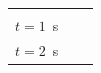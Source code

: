 {\begin{tabular}[t]{|l|l|l|}
         &
    
    
     \tabularnewline\cline{1-1}\cline{2-2}\cline{3-3}
    
    
        \begin{math}t=1\end{math}~s &
    
    
         &
    
    
     \tabularnewline\cline{1-1}\cline{2-2}\cline{3-3}
    
    
        \begin{math}t=2\end{math}~s &
    
    
         &
    
    
     \tabularnewline\cline{1-1}\cline{2-2}\cline{3-3}
    

\end{tabular}}
